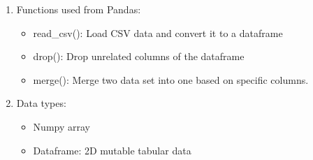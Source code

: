 \documentclass[fontsize=11pt]{article}
\begin{document}
\begin{enumerate}
\begin{enumerate}
\begin{enumerate}
            \item Functions used from Pandas:
            \begin{itemize}
                \item read\_csv(): Load CSV data and convert it to a dataframe
                \item drop(): Drop unrelated columns of the dataframe
                \item merge(): Merge two data set into one based on specific columns.
            \end{itemize}
            \item Data types:
            \begin{itemize}
                \item Numpy array
                \item Dataframe: 2D mutable tabular data
            \end{itemize}
        \end{enumerate}
        

\end{enumerate}
\end{enumerate}
\end{document}
